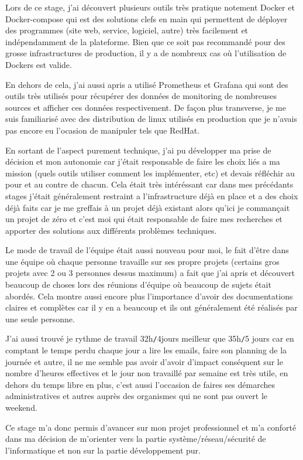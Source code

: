 Lors de ce stage, j'ai découvert plusieurs outils très pratique notement Docker et Docker-compose qui est des solutions clefs en main qui permettent de déployer des programmes (site web, service, logiciel, autre) très facilement et indépendamment de la plateforme. Bien que ce soit pas recommandé pour des grosse infrastructures de production, il y a de nombreux cas où l'utilisation de Dockers est valide.

En dehors de cela, j'ai aussi apris a utilisé Prometheus et Grafana qui sont des outils très utilisés pour récupérer des données de monitoring de nombreuses sources et afficher ces données respectivement. De façon plus transverse, je me suis familiarisé avec des distribution de linux utilisés en production que je n'avais pas encore eu l'ocasion de manipuler tels que RedHat.

En sortant de l'aspect purement technique, j'ai pu développer ma prise de décision et mon autonomie car j'était responsable de faire les choix liés a ma mission (quels outils utiliser comment les implémenter, etc) et devais réfléchir au pour et au contre de chacun. Cela était très intéréssant car dans mes précédants stages j'était généralement restraint a l'infrastructure déjà en place et a des choix déjà faits car je me greffais à un projet déjà existant alors qu'ici je commançait un projet de zéro et c'est moi qui était responsable de faire mes recherches et apporter des solutions aux différents problèmes techniques.

Le mode de travail de l'équipe était aussi nouveau pour moi, le fait d'être dans une équipe où chaque personne travaille sur ses propre projets (certains gros projets avec 2 ou 3 personnes dessus maximum) a fait que j'ai apris et découvert beaucoup de choses lors des réunions d'équipe où beaucoup de sujets était abordés. Cela montre aussi encore plus l'importance d'avoir des documentations claires et complètes car il y en a beaucoup et ils ont généralement été réalisés par une seule personne.

J'ai aussi trouvé je rythme de travail 32h\verb|/|4jours meilleur que 35h\verb|/|5 jours car en comptant le temps perdu chaque jour a lire les emails, faire son planning de la journée et autre, il ne me semble pas avoir d'avoir d'impact conséquent sur le nombre d'heures effectives et le jour non travaillé par semaine est très utile, en dehors du temps libre en plus, c'est aussi l'occasion de faires ses démarches administratives et autres auprès des organismes qui ne sont pas ouvert le weekend.

Ce stage m'a donc permis d'avancer sur mon projet professionnel et m'a conforté dans ma décision de m'orienter vers la partie système/réseau/sécurité de l'informatique et non sur la partie développement pur.
